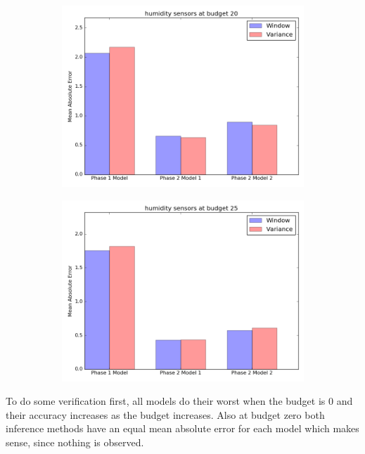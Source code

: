 \documentclass{article}
\begin{document}
\begin{figure}[h!]
	\begin{subfigure}{\linewidth}
	\includegraphics[scale=0.5]{humidity_20.png}
	\end{subfigure}
	\begin{subfigure}{\linewidth}
	\includegraphics[scale=0.5]{humidity_25.png}
	\end{subfigure}
\end{figure}

\newpage

To do some verification first, all models do their
worst when the budget is 0 and their accuracy
increases as the budget increases. Also at
budget zero both inference methods have an equal
mean absolute error for each model which makes
sense, since nothing is observed.
\end{document}
